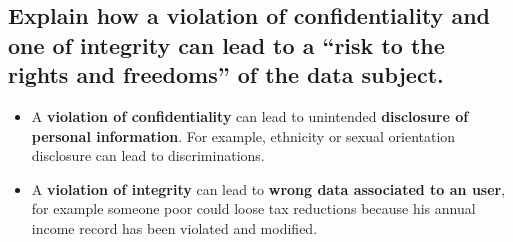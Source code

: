 \documentclass[9pt, letterpaper]{article}
\begin{document}
\subsection{Explain how a violation of confidentiality and one of integrity can lead to a “risk to the rights and freedoms” of the data subject.}
\begin{itemize}
	\item A \textbf{violation of confidentiality} can lead to unintended \textbf{disclosure of personal information}. For example, ethnicity or sexual orientation disclosure can lead to discriminations.
	\item A \textbf{violation of integrity} can lead to \textbf{wrong data associated to an user}, for example someone poor could loose tax reductions because his annual income record has been violated and modified.
\end{itemize}
\end{document}
